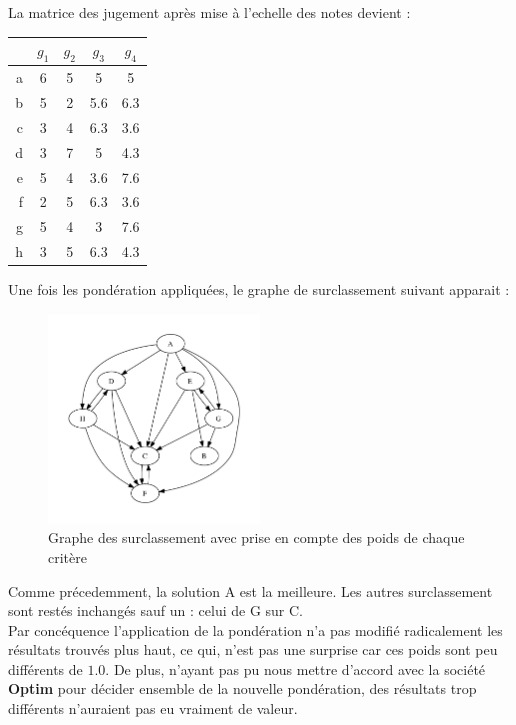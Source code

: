 La matrice des jugement après mise à l'echelle des notes devient :

\begin{center}
	\begin{tabular}{r | c c c c}
		~ & $g_1$ & $g_2$ & $g_3$ & $g_4$ \\ \hline
		a & 6 & 5 & 5   & 5   \\
		b & 5 & 2 & 5.6 & 6.3 \\
		c & 3 & 4 & 6.3 & 3.6 \\
		d & 3 & 7 & 5   & 4.3 \\
		e & 5 & 4 & 3.6 & 7.6 \\
		f & 2 & 5 & 6.3 & 3.6 \\
		g & 5 & 4 & 3   & 7.6 \\
		h & 3 & 5 & 6.3 & 4.3 \\
	\end{tabular}
\end{center}

\clearpage

Une fois les pondération appliquées, le graphe de surclassement suivant apparait :
\begin{figure}[!h]
\begin{center}
\includegraphics[width=0.5\textwidth]{../SourcesMatlab/electre3-2.pdf}
\caption{Graphe des surclassement avec prise en compte des poids de chaque critère}
\end{center}
\end{figure}

Comme précedemment, la solution A est la meilleure. Les autres surclassement sont restés inchangés sauf un : celui de G sur C.\\
Par concéquence l'application de la pondération n'a pas modifié radicalement les résultats trouvés plus haut, ce qui, n'est pas une surprise car ces poids 
sont peu différents de $1.0$. De plus, n'ayant pas pu nous mettre d'accord avec la société \textbf{Optim} pour décider ensemble de la nouvelle pondération,
des résultats trop différents n'auraient pas eu vraiment de valeur.

